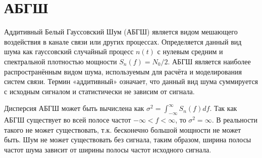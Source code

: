 \section{АБГШ}
\label{sec:awgn}

Аддитивный Белый Гауссовский Шум (АБГШ) является видом мешающего воздействия в канале связи или других процессах. Определяется данный вид шума как гауссовский случайный процесс $n(t )$ с нулевым средним и спектральной плотностью мощности $S_n( f ) = N_0 / 2$. АБГШ является наиболее распространённым видом шума, используемым для расчёта и моделирования систем связи. Термин «аддитивный» означает, что данный вид шума суммируется с исходным сигналом и статистически не зависим от сигнала.

Дисперсия АБГШ может быть вычислена как $\sigma^2 = \int_{-\infty}^{\infty}S_n(f)df$. Так как АБГШ существует во всей полосе частот $-\infty < f < \infty$, то $\sigma^2 = \infty$. В реальности такого не может существовать, т.к. бесконечно большой мощности не может быть. Шум не может существовать без сигнала, таким образом, ширина полосы частот шума зависит от ширины полосы частот исходного сигнала.

\newpage